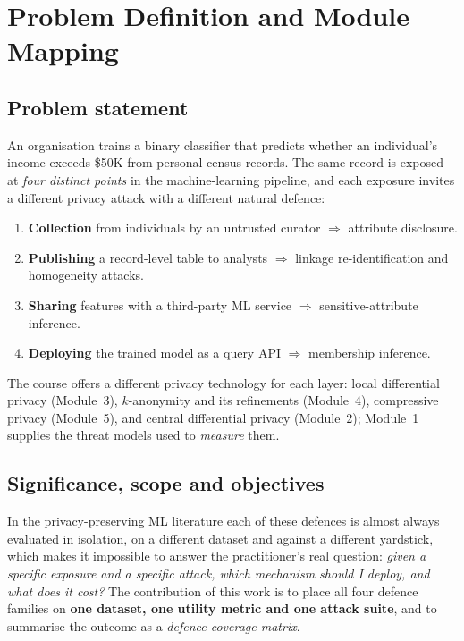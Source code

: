 \documentclass[11pt,a4paper]{article}
\begin{document}
\section{Problem Definition and Module Mapping}\label{sec:problem}

\subsection{Problem statement}
An organisation trains a binary classifier that predicts whether an individual's
income exceeds \$50K from personal census records. The same record is exposed at
\emph{four distinct points} in the machine-learning pipeline, and each exposure
invites a different privacy attack with a different natural defence:
\begin{enumerate}
\item \textbf{Collection} from individuals by an untrusted curator $\Rightarrow$ attribute disclosure.
\item \textbf{Publishing} a record-level table to analysts $\Rightarrow$ linkage re-identification and homogeneity attacks.
\item \textbf{Sharing} features with a third-party ML service $\Rightarrow$ sensitive-attribute inference.
\item \textbf{Deploying} the trained model as a query API $\Rightarrow$ membership inference.
\end{enumerate}
The course offers a different privacy technology for each layer: local differential
privacy (Module~3), $k$-anonymity and its refinements (Module~4), compressive
privacy (Module~5), and central differential privacy (Module~2); Module~1 supplies
the threat models used to \emph{measure} them.

\subsection{Significance, scope and objectives}
In the privacy-preserving ML literature each of these defences is almost always
evaluated in isolation, on a different dataset and against a different yardstick,
which makes it impossible to answer the practitioner's real question: \emph{given a
specific exposure and a specific attack, which mechanism should I deploy, and what
does it cost?} The contribution of this work is to place all four defence families
on \textbf{one dataset, one utility metric and one attack suite}, and to summarise
the outcome as a \emph{defence-coverage matrix}.
\end{document}
